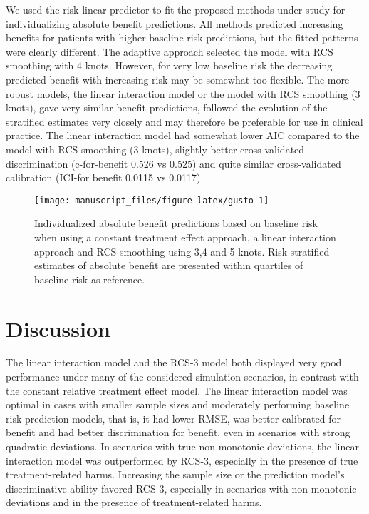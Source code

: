 \documentclass[]{elsarticle} %
\begin{document}
We used the risk linear predictor to fit the proposed methods under
study for individualizing absolute benefit predictions. All methods
predicted increasing benefits for patients with higher baseline risk
predictions, but the fitted patterns were clearly different. The
adaptive approach selected the model with RCS smoothing with 4 knots.
However, for very low baseline risk the decreasing predicted benefit
with increasing risk may be somewhat too flexible. The more robust
models, the linear interaction model or the model with RCS smoothing (3
knots), gave very similar benefit predictions, followed the evolution of
the stratified estimates very closely and may therefore be preferable
for use in clinical practice. The linear interaction model had somewhat
lower AIC compared to the model with RCS smoothing (3 knots), slightly
better cross-validated discrimination (c-for-benefit 0.526 vs 0.525) and
quite similar cross-validated calibration (ICI-for benefit 0.0115 vs
0.0117).

\begin{figure}
\texttt{[image: manuscript\_files/figure-latex/gusto-1]} \caption{Individualized absolute benefit predictions based on baseline risk when using a constant treatment effect approach, a linear interaction approach and RCS smoothing using 3,4 and 5 knots. Risk stratified estimates of absolute benefit are presented within quartiles of baseline risk as reference.}\label{fig:gusto}
\end{figure}

\hypertarget{discussion}{%
\section{Discussion}\label{discussion}}

The linear interaction model and the RCS-3 model both displayed very
good performance under many of the considered simulation scenarios, in
contrast with the constant relative treatment effect model. The linear
interaction model was optimal in cases with smaller sample sizes and
moderately performing baseline risk prediction models, that is, it had
lower RMSE, was better calibrated for benefit and had better
discrimination for benefit, even in scenarios with strong quadratic
deviations. In scenarios with true non-monotonic deviations, the linear
interaction model was outperformed by RCS-3, especially in the presence
of true treatment-related harms. Increasing the sample size or the
prediction model's discriminative ability favored RCS-3, especially in
scenarios with non-monotonic deviations and in the presence of
treatment-related harms.
\end{document}
